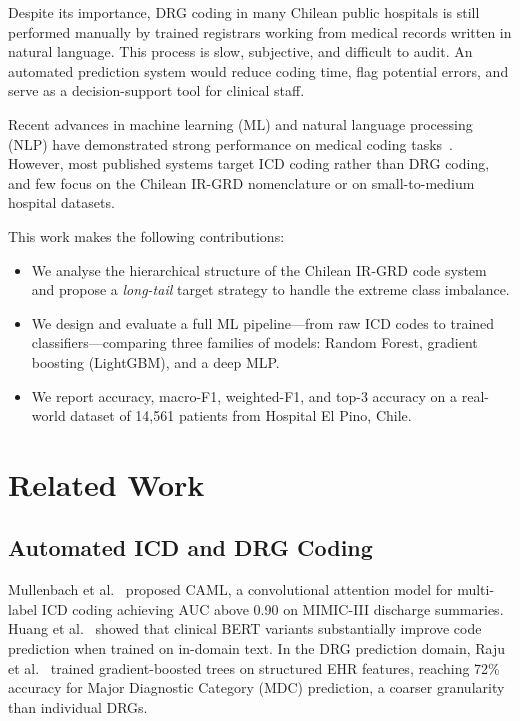 \documentclass{IEEEtran}
\begin{document}
Despite its importance, DRG coding in many Chilean public hospitals
is still performed manually by trained registrars working from medical
records written in natural language.
This process is slow, subjective, and difficult to audit.
An automated prediction system would reduce coding time,
flag potential errors, and serve as a decision-support tool
for clinical staff.

Recent advances in machine learning (ML) and natural language
processing (NLP) have demonstrated strong performance on medical
coding tasks~\cite{mullenbach2018explainable}.  However, most
published systems target ICD coding rather than DRG coding, and
few focus on the Chilean IR-GRD nomenclature or on small-to-medium
hospital datasets.

This work makes the following contributions:
\begin{itemize}
  \item We analyse the hierarchical structure of the Chilean IR-GRD
        code system and propose a \emph{long-tail} target strategy
        to handle the extreme class imbalance.
  \item We design and evaluate a full ML pipeline—from raw ICD
        codes to trained classifiers—comparing three families of
        models: Random Forest, gradient boosting (LightGBM), and
        a deep MLP.
  \item We report accuracy, macro-F1, weighted-F1, and top-3
        accuracy on a real-world dataset of 14{,}561 patients from
        Hospital El Pino, Chile.
\end{itemize}

\section{Related Work}

\subsection{Automated ICD and DRG Coding}
Mullenbach et al.~\cite{mullenbach2018explainable} proposed CAML, a
convolutional attention model for multi-label ICD coding achieving
AUC above 0.90 on MIMIC-III discharge summaries.
Huang et al.~\cite{huang2019clinicalbert} showed that clinical
BERT variants substantially improve code prediction when trained on
in-domain text.
In the DRG prediction domain, Raju et al.~\cite{raju2021drg}
trained gradient-boosted trees on structured EHR features,
reaching 72\% accuracy for Major Diagnostic Category (MDC)
prediction, a coarser granularity than individual DRGs.
\end{document}
